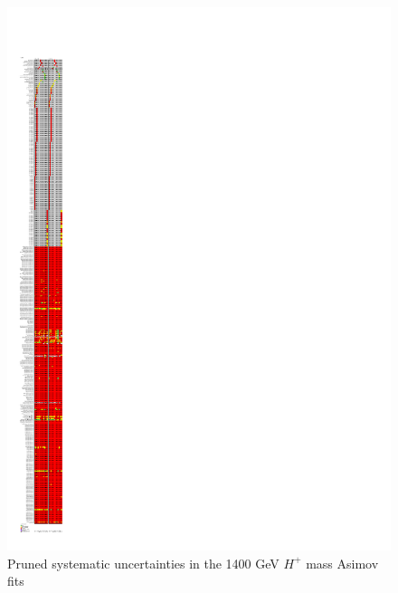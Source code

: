 \begin{figure}[H]
  \centering
  \includegraphics[keepaspectratio, scale=0.85]{images/Pruning/Pruning_Asimov_Hp1400_Contained80_DL1r_70.pdf}
  \caption{Pruned systematic uncertainties in the 1400 GeV $H^{+}$ mass Asimov fits}
  \label{fig:Pruning_Asimov_Hp1400_Contained80_DL1r_70}
\end{figure}

